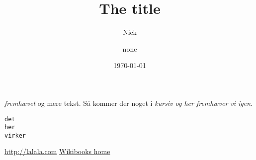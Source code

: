 

\title{The title}

\author{Nick \and none}
\date{\today}


\maketitle
\emph{fremhævet} og mere tekst.
Så kommer der noget i \textit{kursiv
og her \emph{fremhæver} vi igen}.

\begin{alltt}
det 
	her
		virker
\end{alltt}
\url{http://lalala.com}
\href{http://www.wikibooks.org}{Wikibooks home}


